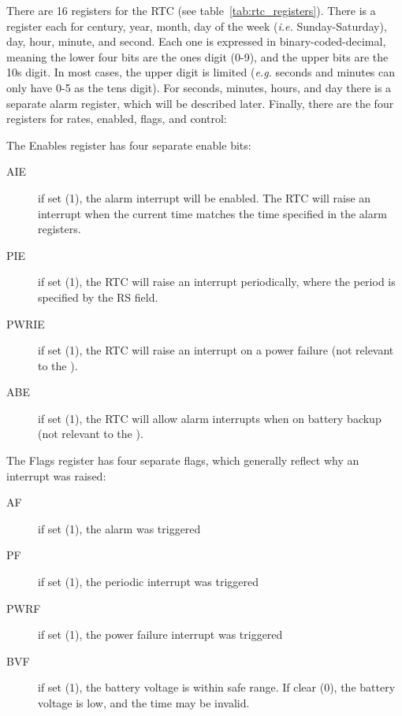There are 16 registers for the RTC (see table~\ref{tab:rtc_registers}). There is a register each for century, year, month, day of the week ({\it i.e.} Sunday-Saturday), day, hour, minute, and second. Each one is expressed in binary-coded-decimal, meaning the lower four bits are the ones digit (0-9), and the upper bits are the 10s digit. In most cases, the upper digit is limited ({\it e.g.} seconds and minutes can only have 0-5 as the tens digit). For seconds, minutes, hours, and day there is a separate alarm register, which will be described later. Finally, there are the four registers for rates, enabled, flags, and control:

The Enables register has four separate enable bits:
\begin{description}
    \item[AIE] if set (1), the alarm interrupt will be enabled. The RTC will raise an interrupt when the current time matches the time specified in the alarm registers.

    \item[PIE] if set (1), the RTC will raise an interrupt periodically, where the period is specified by the RS field.

    \item[PWRIE] if set (1), the RTC will raise an interrupt on a power failure (not relevant to the \jr).

    \item[ABE] if set (1), the RTC will allow alarm interrupts when on battery backup (not relevant to the \jr).
\end{description}

The Flags register has four separate flags, which generally reflect why an interrupt was raised:
\begin{description}
    \item[AF] if set (1), the alarm was triggered

    \item[PF] if set (1), the periodic interrupt was triggered

    \item[PWRF] if set (1), the power failure interrupt was triggered

    \item[BVF] if set (1), the battery voltage is within safe range. If clear (0), the battery voltage is low, and the time may be invalid.
\end{description}

